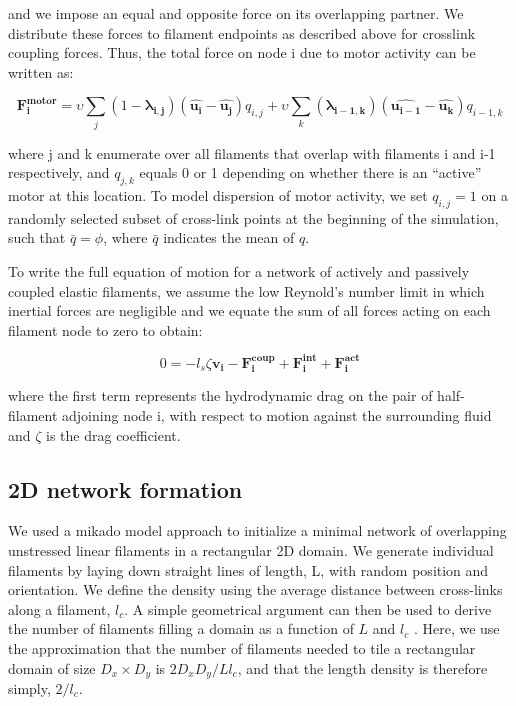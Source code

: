 \documentclass[10pt,letterpaper]{article}
\begin{document}
and we impose an equal and opposite force on its overlapping partner.  We distribute these forces to filament endpoints as described above for crosslink coupling forces.  Thus, the total force on node i due to motor activity can be written as:

\begin{equation}
\label{eqn:active}
\mathbf{F^{motor}_{i}} = \upsilon \sum_j (1 - \mathbf{\lambda_{i,j}}) \left (\mathbf{\hat{u_{i}}} - \mathbf{\hat{u_j}} \right ) q_{i,j}
                        +  \upsilon \sum_k (\mathbf{\lambda_{i-1,k}}) \left (\mathbf{\hat{u_{i-1}}} - \mathbf{\hat{u_k}} \right ) q_{i-1,k} 
\end{equation}


where j and k enumerate over all filaments that overlap with filaments i and i-1 respectively, and $q_{j,k}$ equals 0 or 1 depending on whether there is an ``active'' motor at this location. To model dispersion of motor activity, we set $q_{i,j}=1$  on a randomly selected subset of cross-link points at the beginning of the simulation, such that $\bar{q}=\phi$, where $\bar{q}$ indicates the mean of $q$.


To write the full equation of motion for a network of actively and passively coupled elastic filaments, we assume the low Reynold's number limit in which inertial forces are negligible and we equate the sum of all forces acting on each filament node to zero to obtain:

\begin{equation}
\label{eqn:syst3}
0=-l_s\zeta\mathbf{ v_i} -\mathbf{F^{coup}_i}+ \mathbf{F^{int}_i}+\mathbf{F^{act}_i} 
\end{equation}

where the first term represents the hydrodynamic drag on the pair of half-filament adjoining node i, with respect to motion against the surrounding fluid and $\zeta$ is the drag coefficient.

\subsection*{2D network formation}

We used a mikado model approach \cite{Unterberger2014} to initialize a minimal network of overlapping unstressed linear filaments in a rectangular 2D domain. We generate individual filaments by laying down straight lines of length, L, with random position and orientation. We define the density using the average distance between cross-links along a filament, $l_c$. A simple geometrical argument can then be used to derive the number of filaments filling a domain as a function of $L$ and $l_c$ \cite{theo_hlm}.  Here, we use the approximation that the number of filaments needed to tile a rectangular domain of size $D_x \times D_y$  is $2D_xD_y/Ll_c$, and that the length density is therefore simply, $2/l_c$. 
\end{document}
